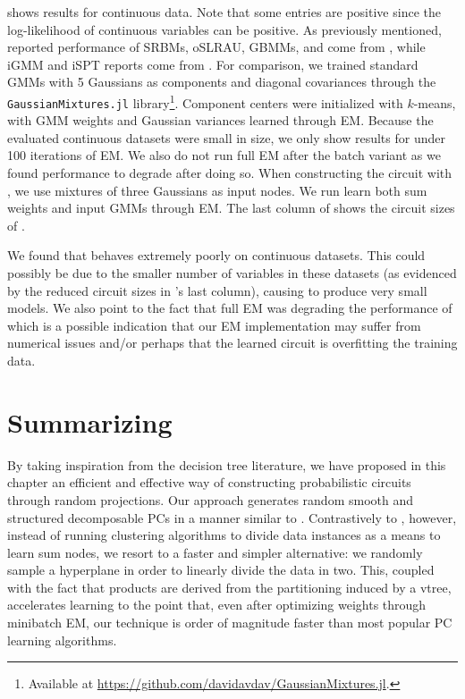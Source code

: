  shows results for continuous data. Note that some entries are positive since the
log-likelihood of continuous variables can be positive. As previously mentioned, reported
performance of SRBMs, oSLRAU, GBMMs, and  come from \citet{jaini18a}, while
iGMM and iSPT reports come from \citet{trapp16}. For comparison, we trained standard GMMs with 5
Gaussians as components and diagonal covariances through the \texttt{GaussianMixtures.jl}
library\footnote{Available at \url{https://github.com/davidavdav/GaussianMixtures.jl}.}. Component
centers were initialized with $k$-means, with GMM weights and Gaussian variances learned through
EM. Because the evaluated continuous datasets were small in size, we only show results for
 under 100 iterations of EM. We also do not run full EM after the batch variant
as we found performance to degrade after doing so. When constructing the circuit with
, we use mixtures of three Gaussians as input nodes. We run learn both sum
weights and input GMMs through EM. The last column of  shows the circuit sizes of
.

We found that  behaves extremely poorly on continuous datasets. This could
possibly be due to the smaller number of variables in these datasets (as evidenced by the reduced
circuit sizes in 's last column), causing  to produce very small
models. We also point to the fact that full EM was degrading the performance of 
which is a possible indication that our EM implementation may suffer from numerical issues and/or
perhaps that the learned circuit is overfitting the training data.

\section{Summarizing }

By taking inspiration from the decision tree literature, we have proposed in this chapter an
efficient and effective way of constructing probabilistic circuits through random projections. Our
approach generates random smooth and structured decomposable PCs in a manner similar to
. Contrastively to , however, instead of running clustering
algorithms to divide data instances as a means to learn sum nodes, we resort to a faster and
simpler alternative: we randomly sample a hyperplane in order to linearly divide the data in two.
This, coupled with the fact that products are derived from the partitioning induced by a vtree,
accelerates learning to the point that, even after optimizing weights through minibatch EM, our
technique is order of magnitude faster than most popular PC learning algorithms.

